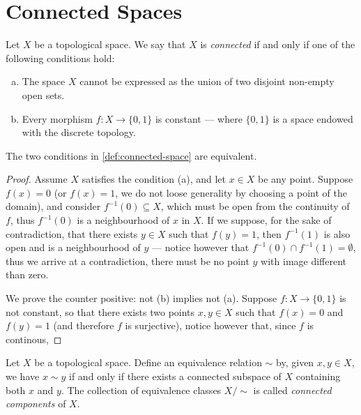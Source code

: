 \section{Connected Spaces}

\begin{definition}
\label{def:connected-space}
Let \(X\) be a topological space. We say that \(X\) is \emph{connected} if and
only if one of the following conditions hold:
\begin{enumerate}[(a)]\setlength\itemsep{0em}
\item The space \(X\) cannot be expressed as the union of two disjoint non-empty
open sets.
\item Every morphism \(f: X \to \{0, 1\}\) is constant --- where \(\{0, 1\}\) is
a space endowed with the discrete topology.
\end{enumerate}
\end{definition}

\begin{corollary}
The two conditions in \cref{def:connected-space} are equivalent.
\end{corollary}

\begin{proof}
Assume \(X\) satisfies the condition (a), and let \(x \in X\) be any
point. Suppose \(f(x) = 0\) (or \(f(x) = 1\), we do not loose generality by
choosing a point of the domain), and consider \(f^{-1}(0) \subseteq X\), which
must be open from the continuity of \(f\), thus \(f^{-1}(0)\) is a neighbourhood
of \(x\) in \(X\). If we suppose, for the sake of contradiction, that there
exists \(y \in X\) such that \(f(y) = 1\), then \(f^{-1}(1)\) is also open and
is a neighbourhood of \(y\) --- notice however that \(f^{-1}(0) \cap f^{-1}(1) =
\emptyset\), thus we arrive at a contradiction, there must be no point \(y\)
with image different than zero.

We prove the counter positive: not (b) implies not (a). Suppose \(f: X
\to \{0, 1\}\) is not constant, so that there exists two points \(x, y \in X\)
such that \(f(x) = 0\) and \(f(y) = 1\) (and therefore \(f\) is surjective),
notice however that, since \(f\) is continous,
\end{proof}

\begin{definition}
\label{def:connected-components}
Let \(X\) be a topological space. Define an equivalence relation \(\sim\) by,
given \(x, y \in X\), we have \(x \sim y\) if and only if there exists a
connected subspace of \(X\) containing both \(x\) and \(y\). The collection of
equivalence classes \(X/{\sim}\) is called \emph{connected components} of \(X\).
\end{definition}

